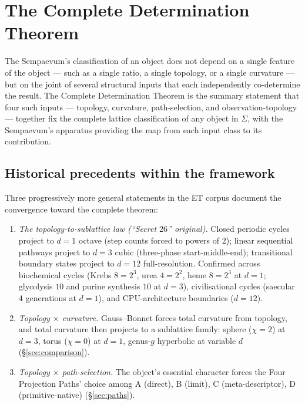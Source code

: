 \documentclass[11pt,a4paper]{article}
\theoremstyle{definition}
\theoremstyle{remark}
\begin{document}
\section{The Complete Determination Theorem}\label{sec:secret26}

The Sempaevum's classification of an object does not depend on a single feature of the object --- such as a single ratio, a single topology, or a single curvature --- but on the joint of several structural inputs that each independently co-determine the result. The Complete Determination Theorem is the summary statement that four such inputs --- topology, curvature, path-selection, and observation-topology --- together fix the complete lattice classification of any object in $\Sigma$, with the Sempaevum's apparatus providing the map from each input class to its contribution.

\subsection{Historical precedents within the framework}

Three progressively more general statements in the ET corpus document the convergence toward the complete theorem:
\begin{enumerate}[leftmargin=*]
\item \emph{The topology-to-sublattice law (``Secret $26$'' original).} Closed periodic cycles project to $d=1$ octave (step counts forced to powers of $2$); linear sequential pathways project to $d=3$ cubic (three-phase start-middle-end); transitional boundary states project to $d=12$ full-resolution. Confirmed across biochemical cycles (Krebs $8=2^{3}$, urea $4=2^{2}$, heme $8=2^{3}$ at $d=1$; glycolysis $10$ and purine synthesis $10$ at $d=3$), civilisational cycles (saecular $4$ generations at $d=1$), and CPU-architecture boundaries ($d=12$).
\item \emph{Topology $\times$ curvature.} Gauss--Bonnet forces total curvature from topology, and total curvature then projects to a sublattice family: sphere ($\chi = 2$) at $d=3$, torus ($\chi = 0$) at $d=1$, genus-$g$ hyperbolic at variable $d$ (\S\ref{sec:comparison}).
\item \emph{Topology $\times$ path-selection.} The object's essential character forces the Four Projection Paths' choice among A (direct), B (limit), C (meta-descriptor), D (primitive-native) (\S\ref{sec:paths}).
\end{enumerate}
\end{document}
